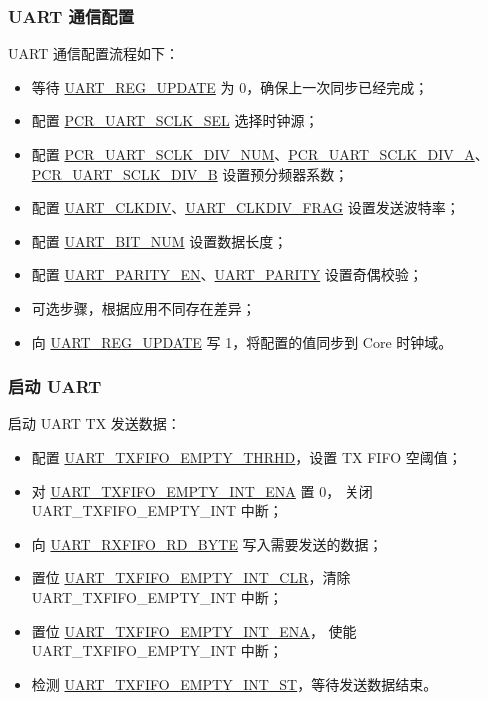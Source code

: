 \documentclass[main\_\_CN.tex]{subfiles}
\begin{document}
\subsubsection{UART 通信配置}

UART 通信配置流程如下：
\begin{itemize}
    \item 等待 \hyperref[fielddesc:UARTREGUPDATE]{UART\_REG\_UPDATE} 为 0，确保上一次同步已经完成；
    \item 配置 \hyperref[fielddesc:PCRUART0SCLKSEL]{PCR\_UART\_SCLK\_SEL} 选择时钟源；
    \item 配置 \hyperref[fielddesc:PCRUART0SCLKDIVNUM]{PCR\_UART\_SCLK\_DIV\_NUM}、\hyperref[fielddesc:PCRUART0SCLKDIVA]{PCR\_UART\_SCLK\_DIV\_A}、\hyperref[fielddesc:PCRUART0SCLKDIVB]{PCR\_UART\_SCLK\_DIV\_B} 设置预分频器系数；
    \item 配置 \hyperref[fielddesc:UARTCLKDIV]{UART\_CLKDIV}、\hyperref[fielddesc:UARTCLKDIVFRAG]{UART\_CLKDIV\_FRAG} 设置发送波特率；
    \item 配置 \hyperref[fielddesc:UARTBITNUM]{UART\_BIT\_NUM} 设置数据长度；
    \item 配置 \hyperref[fielddesc:UARTPARITYEN]{UART\_PARITY\_EN}、\hyperref[fielddesc:UARTPARITY]{UART\_PARITY} 设置奇偶校验；
    \item 可选步骤，根据应用不同存在差异；
    \item 向 \hyperref[fielddesc:UARTREGUPDATE]{UART\_REG\_UPDATE} 写 1，将配置的值同步到 Core 时钟域。
\end{itemize}

\subsubsection{启动 UART}
启动 UART TX 发送数据：
\begin{itemize}
    \item 配置 \hyperref[fielddesc:UARTTXFIFOEMPTYTHRHD]{UART\_TXFIFO\_EMPTY\_THRHD}，设置 TX FIFO 空阈值；
    \item 对 \hyperref[fielddesc:UARTTXFIFOEMPTYINTENA]{UART\_TXFIFO\_EMPTY\_INT\_ENA} 置 0， 关闭 UART\_TXFIFO\_EMPTY\_INT 中断；
    \item 向 \hyperref[fielddesc:UARTRXFIFORDBYTE]{UART\_RXFIFO\_RD\_BYTE} 写入需要发送的数据；
    \item 置位 \hyperref[fielddesc:UARTTXFIFOEMPTYINTCLR]{UART\_TXFIFO\_EMPTY\_INT\_CLR}，清除 UART\_TXFIFO\_EMPTY\_INT 中断；
    \item 置位 \hyperref[fielddesc:UARTTXFIFOEMPTYINTENA]{UART\_TXFIFO\_EMPTY\_INT\_ENA}， 使能 UART\_TXFIFO\_EMPTY\_INT 中断；
    \item 检测 \hyperref[fielddesc:UARTTXFIFOEMPTYINTST]{UART\_TXFIFO\_EMPTY\_INT\_ST}，等待发送数据结束。
\end{itemize}
\end{document}
